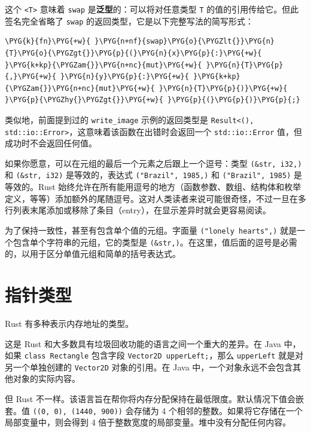 这个 \texttt{<T>} 意味着 \texttt{swap} 是\textbf{泛型}的：可以将对任意类型 \texttt{T} 的值的引用传给它。但此签名完全省略了 \texttt{swap} 的返回类型，它是以下完整写法的简写形式：

\begin{Verbatim}[commandchars=\\\{\},breaklines=true,breakanywhere=true,fontsize=\codefont,xleftmargin=17bp]
\PYG{k}{fn}\PYG{+w}{ }\PYG{n+nf}{swap}\PYG{o}{\PYGZlt{}}\PYG{n}{T}\PYG{o}{\PYGZgt{}}\PYG{p}{(}\PYG{n}{x}\PYG{p}{:}\PYG{+w}{ }\PYG{k+kp}{\PYGZam{}}\PYG{n+nc}{mut}\PYG{+w}{ }\PYG{n}{T}\PYG{p}{,}\PYG{+w}{ }\PYG{n}{y}\PYG{p}{:}\PYG{+w}{ }\PYG{k+kp}{\PYGZam{}}\PYG{n+nc}{mut}\PYG{+w}{ }\PYG{n}{T}\PYG{p}{)}\PYG{+w}{ }\PYG{p}{\PYGZhy{}\PYGZgt{}}\PYG{+w}{ }\PYG{p}{(}\PYG{p}{)}\PYG{p}{;}
\end{Verbatim}

类似地，前面提到过的 \texttt{write\_image} 示例的返回类型是 \texttt{Result<(), std::io::Error>}，这意味着该函数在出错时会返回一个 \texttt{std::io::Error} 值，但成功时不会返回任何值。

如果你愿意，可以在元组的最后一个元素之后跟上一个逗号：类型 \texttt{(\&str, i32,)} 和 \texttt{(\&str, i32)} 是等效的，表达式 \texttt{("Brazil", 1985,)} 和 \texttt{("Brazil", 1985)} 是等效的。Rust 始终允许在所有能用逗号的地方（函数参数、数组、结构体和枚举定义，等等）添加额外的尾随逗号。这对人类读者来说可能很奇怪，不过一旦在多行列表末尾添加或移除了条目（entry），在显示差异时就会更容易阅读。

为了保持一致性，甚至有包含单个值的元组。字面量 \texttt{("lonely hearts",)} 就是一个包含单个字符串的元组，它的类型是 \texttt{(\&str,)}。在这里，值后面的逗号是必需的，以用于区分单值元组和简单的括号表达式。

\section{指针类型}

Rust 有多种表示内存地址的类型。

这是 Rust 和大多数具有垃圾回收功能的语言之间一个重大的差异。在 Java 中，如果 \texttt{class Rectangle} 包含字段 \texttt{Vector2D upperLeft;}，那么 \texttt{upperLeft} 就是对另一个单独创建的 \texttt{Vector2D} 对象的引用。在 Java 中，一个对象永远不会包含其他对象的实际内容。

但 Rust 不一样。该语言旨在帮你将内存分配保持在最低限度。默认情况下值会嵌套。值 \texttt{((0, 0), (1440, 900))} 会存储为 4 个相邻的整数。如果将它存储在一个局部变量中，则会得到 4 倍于整数宽度的局部变量。堆中没有分配任何内容。


